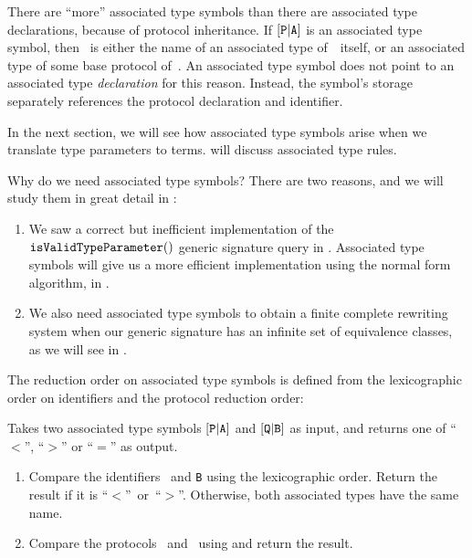 \documentclass[../generics]{subfiles}
\begin{document}
There are ``more'' associated type symbols than there are associated type declarations, because of protocol inheritance. If $[\texttt{P}|\texttt{A}]$ is an associated type symbol, then \nA\ is either the name of an associated type of~\tP\ itself, or an associated type of some base protocol of~\tP. An associated type symbol does not point to an associated type \emph{declaration} for this reason. Instead, the symbol's storage separately references the protocol declaration and identifier.

In the next section, we will see how associated type symbols arise when we translate type parameters to terms.  will discuss associated type rules.

Why do we need associated type symbols? There are two reasons, and we will study them in great detail in :
\begin{enumerate}
\item We saw a correct but inefficient implementation of the $\texttt{isValidTypeParameter}()$ generic signature query in . Associated type symbols will give us a more efficient implementation using the normal form algorithm, in .

\item We also need associated type symbols to obtain a finite complete rewriting system when our generic signature has an infinite set of equivalence classes, as we will see in .
\end{enumerate}

The reduction order on associated type symbols is defined from the lexicographic order on identifiers and the protocol reduction order:
\begin{algorithm}\label{associated type reduction order} Takes two associated type symbols $[\texttt{P}|\texttt{A}]$ and $[\texttt{Q}|\texttt{B}]$ as input, and returns one of ``$<$'', ``$>$'' or ``$=$'' as output.
\begin{enumerate}
\item Compare the identifiers \nA\ and \texttt{B} using the lexicographic order. Return the result if it is ``$<$''~or~``$>$''. Otherwise, both associated types have the same name.
\item Compare the protocols \tP\ and \tQ\ using  and return the result.
\end{enumerate}
\end{algorithm}
\end{document}
